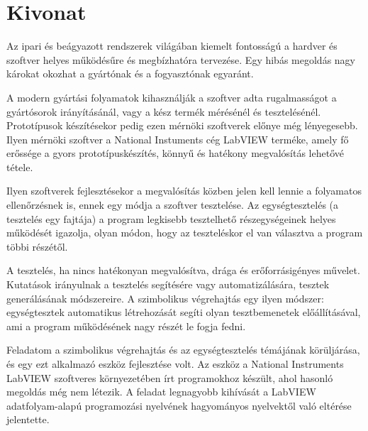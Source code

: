 \setcounter{page}{1}

\selecthungarian

\chapter*{Kivonat}

Az ipari és beágyazott rendszerek világában kiemelt fontosságú a hardver és szoftver helyes működésűre és megbízhatóra tervezése. Egy hibás megoldás nagy károkat okozhat a gyártónak és a fogyasztónak egyaránt.

A modern gyártási folyamatok kihasználják a szoftver adta rugalmasságot a gyártósorok irányításánál, vagy a kész termék mérésénél és tesztelésénél. Prototípusok készítésekor pedig ezen mérnöki szoftverek előnye még lényegesebb. Ilyen mérnöki szoftver a National Instuments cég LabVIEW terméke, amely fő erőssége a gyors prototípuskészítés, könnyű és hatékony megvalósítás lehetővé tétele.

Ilyen szoftverek fejlesztésekor a megvalósítás közben jelen kell lennie a folyamatos ellenőrzésnek is, ennek egy módja a szoftver tesztelése. Az egységtesztelés (a tesztelés egy fajtája) a program legkisebb tesztelhető részegységeinek helyes működését igazolja, olyan módon, hogy az teszteléskor el van választva a program többi részétől.

A tesztelés, ha nincs hatékonyan megvalósítva, drága és erőforrásigényes művelet. Kutatások irányulnak a tesztelés segítésére vagy automatizálására, tesztek generálásának módszereire. A szimbolikus végrehajtás egy ilyen módszer: egységtesztek automatikus létrehozását segíti olyan tesztbemenetek előállításával, ami a program működésének nagy részét le fogja fedni.

Feladatom a szimbolikus végrehajtás és az egységtesztelés témájának körüljárása, és egy ezt alkalmazó eszköz fejlesztése volt. Az eszköz a National Instruments LabVIEW szoftveres környezetében írt programokhoz készült, ahol hasonló megoldás még nem létezik. A feladat legnagyobb kihívását a LabVIEW adatfolyam-alapú programozási nyelvének hagyományos nyelvektől való eltérése jelentette.

